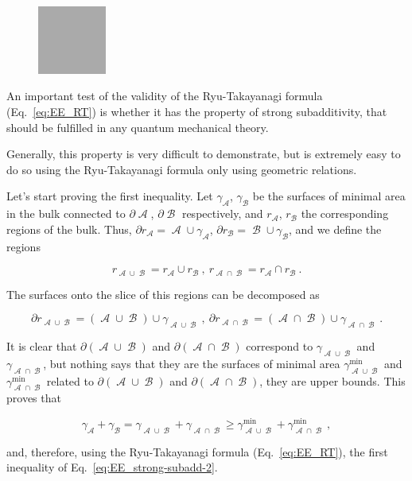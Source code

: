 \documentclass[twocolumn]{revtex4}
\providecommand{\eq}[2]{
    \begin{equation}
        #2
    \label{eq:#1}
    \end{equation}
}
\DeclareMathOperator{\calA}{\mathcal{A}}
\DeclareMathOperator{\calB}{\mathcal{B}}
\begin{document}
\begin{figure}
    \centering
    \includegraphics[width=0.2\textwidth]{Imatges/empty.png}
\label{fig:}
\caption{}
\end{figure}

An important test of the validity of the Ryu-Takayanagi formula (Eq.~\ref{eq:EE_RT}) is whether it has the property of strong subadditivity, that should be fulfilled in any quantum mechanical theory.

Generally, this property is very difficult to demonstrate, but is extremely easy to do so using the Ryu-Takayanagi formula only using geometric relations.

Let's start proving the first inequality. Let $\gamma_{\calA}$, $\gamma_{\calB}$ be the surfaces of minimal area in the bulk connected to $\partial \calA$, $\partial \calB$ respectively, and $r_{\calA}$, $r_{\calB}$ the corresponding regions of the bulk. Thus, $\partial r_{\calA} = \calA \cup \gamma_{\calA}$, $\partial r_{\calB} = \calB \cup \gamma_{\calB}$, and we define the regions
\eq{SS_r-1}{
    r_{\calA \cup \calB} = r_{\calA} \cup r_{\calB} \ , \ r_{\calA \cap \calB} = r_{\calA} \cap r_{\calB} \ .
}
The surfaces onto the slice of this regions can be decomposed as
\eq{SS_dr-1}{
    \partial r_{\calA \cup \calB} = (\calA \cup \calB) \cup \gamma_{\calA \cup \calB} \ , \ \partial r_{\calA \cap \calB } = (\calA \cap \calB) \cup \gamma_{\calA \cap \calB} \ .
    }
It is clear that $\partial (\calA \cup \calB)$ and $\partial (\calA \cap \calB)$ correspond to $\gamma_{\calA \cup \calB}$ and $\gamma_{\calA \cap \calB}$, but nothing says that they are the surfaces of minimal area $\gamma^{\text{min}}_{\calA \cup \calB}$ and $\gamma^{\text{min}}_{\calA \cap \calB}$ related to $\partial (\calA \cup \calB)$ and $\partial (\calA \cap \calB)$, they are upper bounds. This proves that
\eq{SS_gamma-1}{
    \gamma_{\calA} + \gamma_{\calB} = \gamma_{\calA \cup \calB} + \gamma_{\calA \cap \calB} \ge \gamma^{\text{min}}_{\calA \cup \calB} + \gamma^{\text{min}}_{\calA \cap \calB} \ ,
}
and, therefore, using the Ryu-Takayanagi formula (Eq.~\ref{eq:EE_RT}), the first inequality of Eq.~\ref{eq:EE_strong-subadd-2}.
\end{document}

